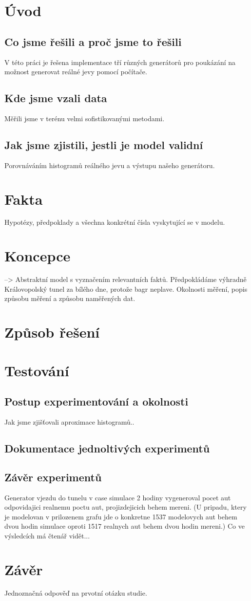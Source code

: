 \documentclass[11pt,a4paper]{article}
\begin{document}
\tableofcontents
\clearpage

\section{Úvod}
	\subsection{Co jsme řešili a proč jsme to řešili}
	V této práci je řešena implementace tří různých generátorů pro poukázání na možnost
	generovat reálné jevy pomocí počítače.
	\subsection{Kde jsme vzali data}
	Měřili jsme v terénu velmi sofistikovanými metodami.
	\subsection{Jak jsme zjistili, jestli je model validní}
	Porovnáváním histogramů reálného jevu a výstupu našeho generátoru.
\section{Fakta}
Hypotézy, předpoklady a všechna konkrétní čísla vyskytující se v modelu.
\section{Koncepce}
--> Abstraktní model s vyznačením relevantních faktů.
Předpokládáme výhradně Královopolský tunel za bílého dne, protože bagr neplave.
Okolnosti měření, popis způsobu měření a způsobu naměřených dat.
\section{Způsob řešení}
\section{Testování}
	\subsection{Postup experimentování a okolnosti}
	Jak jsme zjišťovali aproximace histogramů..
	\subsection{Dokumentace jednoltivých experimentů}
	\subsection{Závěr experimentů}
	Generator vjezdu do tunelu v case simulace 2 hodiny vygeneroval pocet aut odpovidajici realnemu poctu aut, projizdejicich behem mereni. (U pripadu, ktery je modelovan v prilozenem grafu jde o konkretne 1537 modelovych aut behem dvou hodin simulace oproti 1517 realnych aut behem dvou hodin mereni.)
	Co ve výsledcích má čtenář vidět...
\section{Závěr}
Jednoznačná odpověď na prvotní otázku studie.
\end{document}
